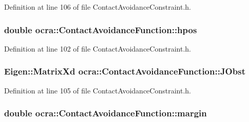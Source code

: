 Definition at line 106 of file Contact\+Avoidance\+Constraint.\+h.

\subsubsection[{\texorpdfstring{hpos}{hpos}}]{\setlength{\rightskip}{0pt plus 5cm}double ocra\+::\+Contact\+Avoidance\+Function\+::hpos\hspace{0.3cm}{\ttfamily [protected]}}\hypertarget{classocra_1_1ContactAvoidanceFunction_a49e94dae2d7708e66cf11e737b1a4d6d}{}\label{classocra_1_1ContactAvoidanceFunction_a49e94dae2d7708e66cf11e737b1a4d6d}


Definition at line 102 of file Contact\+Avoidance\+Constraint.\+h.

\subsubsection[{\texorpdfstring{J\+Obst}{JObst}}]{\setlength{\rightskip}{0pt plus 5cm}Eigen\+::\+Matrix\+Xd ocra\+::\+Contact\+Avoidance\+Function\+::\+J\+Obst\hspace{0.3cm}{\ttfamily [protected]}}\hypertarget{classocra_1_1ContactAvoidanceFunction_a233c509632182b45540a30b818254713}{}\label{classocra_1_1ContactAvoidanceFunction_a233c509632182b45540a30b818254713}


Definition at line 105 of file Contact\+Avoidance\+Constraint.\+h.

\subsubsection[{\texorpdfstring{margin}{margin}}]{\setlength{\rightskip}{0pt plus 5cm}double ocra\+::\+Contact\+Avoidance\+Function\+::margin\hspace{0.3cm}{\ttfamily [protected]}}\hypertarget{classocra_1_1ContactAvoidanceFunction_a5a4c2e4dae17aef6c4cf6fa1b3be093e}{}\label{classocra_1_1ContactAvoidanceFunction_a5a4c2e4dae17aef6c4cf6fa1b3be093e}



